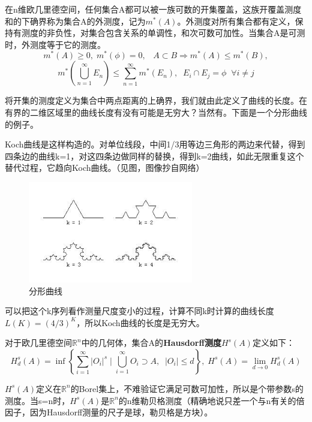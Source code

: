 \songti\setlength{\leftskip}{0em}

在n维欧几里德空间，任何集合A都可以被一族可数的开集覆盖，这族开覆盖测度和的下确界称为集合A的外测度，记为$ m^{*}(A) $。外测度对所有集合都有定义，保持有测度的非负性，对集合包含关系的单调性，和次可数可加性。当集合A是可测时，外测度等于它的测度。
\[m^*(A) \ge 0, \; m^*(\phi)=0,\;\;\; A\subset B \Rightarrow m^*(A)\le m^*(B),\]
\[m^*( \bigcup _{n=1}^\infty  E_n) \le \sum _{n=1}^\infty m^*(E_n),\;\; E_i\cap E_j = \phi\;\;\forall i\neq j\]


将开集的测度定义为集合中两点距离的上确界，我们就由此定义了曲线的长度。在有界的二维区域里的曲线长度有没有可能是无穷大？当然有。下面是一个分形曲线的例子。

\kaishu\setlength{\leftskip}{1em}

Koch曲线是这样构造的。对单位线段，中间1/3用等边三角形的两边来代替，得到四条边的曲线k=1，对这四条边做同样的替换，得到k=2曲线，如此无限重复这个替代过程，它趋向Koch曲线。（见图，图像抄自网络）

\begin{figure}[h]
	\centering
	\includegraphics[width=0.7\linewidth]{pic/151409kzeswb2kzreg87zm.png}
	\caption{分形曲线}
	\label{fig:151409kzeswb2kzreg87zm}
\end{figure}


可以把这个k序列看作测量尺度变小的过程，计算不同k时计算的曲线长度$ L(K)=(4/3)^{K} $，所以Koch曲线的长度是无穷大。

\songti\setlength{\leftskip}{0em}

对于欧几里德空间$ \mathbb{R}^n $中的几何体，集合A的\textbf{Hausdorff测度}$ H^s(A) $定义如下：
\begin{equation}
	H_d^s(A)=\inf \left\{\sum_{i=1}^\infty |O_i|^s \mid \bigcup_{i=1}^\infty O_i \supset A, \;\; |O_i| \le d\right \},\; 
	H^s(A)=\lim_{d\rightarrow 0}H_d^s(A)
\end{equation}

$H^s(A) $定义在$ \mathbb{R}^n $的Borel集上，不难验证它满足可数可加性，所以是个带参数s的测度。当s=n时，$ H^s(A) $是$ \mathbb{R}^n $的n维勒贝格测度（精确地说只差一个与n有关的倍因子，因为Hausdorff测量的尺子是球，勒贝格是方块）。

